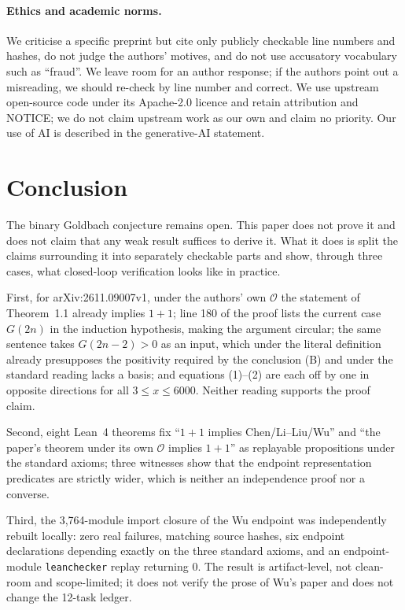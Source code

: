 \documentclass[11pt,a4paper]{article}
\theoremstyle{plain}
\theoremstyle{definition}
\begin{document}
\paragraph{Ethics and academic norms.}
We criticise a specific preprint but cite only publicly checkable line numbers and hashes, do not judge the authors' motives, and do not use accusatory vocabulary such as ``fraud''. We leave room for an author response; if the authors point out a misreading, we should re-check by line number and correct. We use upstream open-source code under its Apache-2.0 licence and retain attribution and NOTICE; we do not claim upstream work as our own and claim no priority. Our use of AI is described in the generative-AI statement.

\section{Conclusion}
\label{sec:conclusion}

The binary Goldbach conjecture remains open. This paper does not prove it and does not claim that any weak result suffices to derive it. What it does is split the claims surrounding it into separately checkable parts and show, through three cases, what closed-loop verification looks like in practice.

First, for arXiv:2611.09007v1, under the authors' own $\mathcal O$ the statement of Theorem~1.1 already implies $1+1$; line 180 of the proof lists the current case $G(2n)$ in the induction hypothesis, making the argument circular; the same sentence takes $G(2n-2)>0$ as an input, which under the literal definition already presupposes the positivity required by the conclusion (B) and under the standard reading lacks a basis; and equations (1)--(2) are each off by one in opposite directions for all $3\le x\le6000$. Neither reading supports the proof claim.

Second, eight Lean~4 theorems fix ``$1+1$ implies Chen/Li--Liu/Wu'' and ``the paper's theorem under its own $\mathcal O$ implies $1+1$'' as replayable propositions under the standard axioms; three witnesses show that the endpoint representation predicates are strictly wider, which is neither an independence proof nor a converse.

Third, the 3,764-module import closure of the Wu endpoint was independently rebuilt locally: zero real failures, matching source hashes, six endpoint declarations depending exactly on the three standard axioms, and an endpoint-module \texttt{leanchecker} replay returning 0. The result is artifact-level, not clean-room and scope-limited; it does not verify the prose of Wu's paper and does not change the 12-task ledger.
\end{document}
